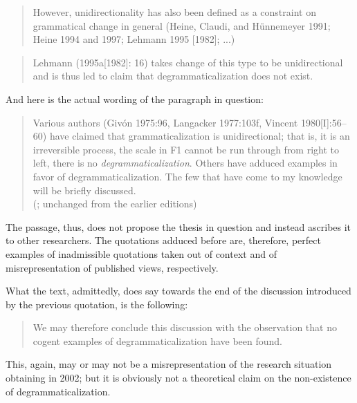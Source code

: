 \begin{quote}
However, unidirectionality has also been defined as a constraint on grammatical change in general (Heine, Claudi, and Hünnemeyer 1991; Heine 1994 and 1997; Lehmann 1995 [1982]; ...)\\
\citep[50]{Norde2009}
\end{quote}

\begin{quote}
Lehmann (1995a[1982]: 16) takes change of this type to be unidirectional and is thus led to claim that degrammaticalization does not exist.\\
\citep[163]{BörjarsEtAl2011}
\end{quote}

\noindent And here is the actual wording of the paragraph in question:

\begin{quote}
Various authors (Givón 1975:96, Langacker 1977:103f, Vincent 1980[I]:56--60) have claimed that grammaticalization is unidirectional; that is, it is an irreversible process, the scale in F1 cannot be run through from right to left, there is no \textit{degrammaticalization}. Others have adduced examples in favor of degrammaticalization. The few that have come to my knowledge will be briefly discussed.\\
(\citealt[14]{Lehmann2002b}; unchanged from the earlier editions)
\end{quote}

\noindent The passage, thus, does not propose the thesis in question and instead ascribes it to other researchers. The quotations adduced before are, therefore, perfect examples of inadmissible quotations taken out of context and of misrepresentation of published views, respectively.

What the text, admittedly, does say towards the end of the discussion introduced by the previous quotation, is the following:

\begin{quote}
We may therefore conclude this discussion with the observation that no cogent examples of degrammaticalization have been found.\\
\citep[17]{Lehmann2002b}
\end{quote}

\noindent This, again, may or may not be a misrepresentation of the research situation obtaining in 2002; but it is obviously not a theoretical claim on the non-existence of degrammaticalization.

